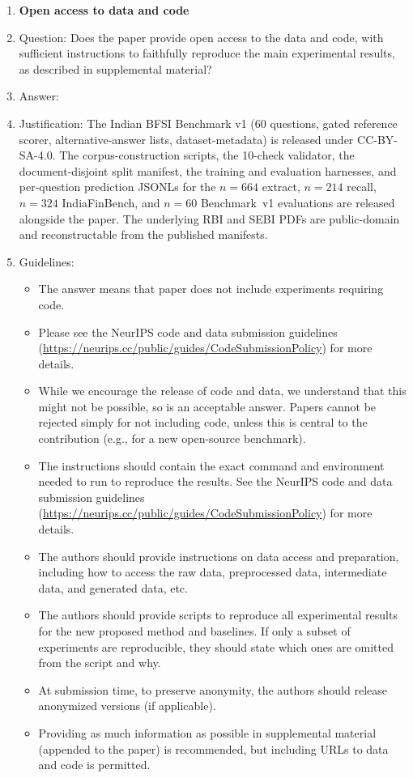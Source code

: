 \begin{enumerate}
\item {\bf Open access to data and code}
    \item[] Question: Does the paper provide open access to the data and code, with sufficient instructions to faithfully reproduce the main experimental results, as described in supplemental material?
    \item[] Answer: \answerYes{}
    \item[] Justification: The Indian BFSI Benchmark v1 (60 questions, gated reference scorer, alternative-answer lists, dataset-metadata) is released under CC-BY-SA-4.0. The corpus-construction scripts, the 10-check validator, the document-disjoint split manifest, the training and evaluation harnesses, and per-question prediction JSONLs for the $n{=}664$ extract, $n{=}214$ recall, $n{=}324$ IndiaFinBench, and $n{=}60$ Benchmark~v1 evaluations are released alongside the paper. The underlying RBI and SEBI PDFs are public-domain and reconstructable from the published manifests.
    \item[] Guidelines:
    \begin{itemize}
        \item The answer \answerNA{} means that paper does not include experiments requiring code.
        \item Please see the NeurIPS code and data submission guidelines (\url{https://neurips.cc/public/guides/CodeSubmissionPolicy}) for more details.
        \item While we encourage the release of code and data, we understand that this might not be possible, so \answerNo{} is an acceptable answer. Papers cannot be rejected simply for not including code, unless this is central to the contribution (e.g., for a new open-source benchmark).
        \item The instructions should contain the exact command and environment needed to run to reproduce the results. See the NeurIPS code and data submission guidelines (\url{https://neurips.cc/public/guides/CodeSubmissionPolicy}) for more details.
        \item The authors should provide instructions on data access and preparation, including how to access the raw data, preprocessed data, intermediate data, and generated data, etc.
        \item The authors should provide scripts to reproduce all experimental results for the new proposed method and baselines. If only a subset of experiments are reproducible, they should state which ones are omitted from the script and why.
        \item At submission time, to preserve anonymity, the authors should release anonymized versions (if applicable).
        \item Providing as much information as possible in supplemental material (appended to the paper) is recommended, but including URLs to data and code is permitted.
    \end{itemize}



\end{enumerate}
